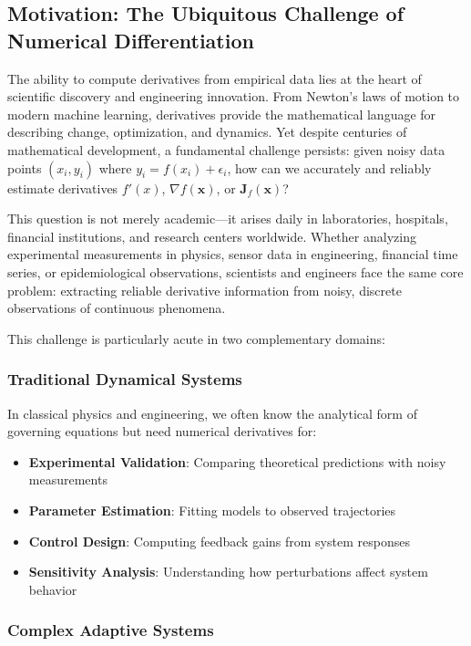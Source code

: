 \documentclass[10pt,journal,compsoc]{IEEEtran}
\begin{document}
\subsection{Motivation: The Ubiquitous Challenge of Numerical Differentiation}

The ability to compute derivatives from empirical data lies at the heart of scientific discovery and engineering innovation. From Newton's laws of motion to modern machine learning, derivatives provide the mathematical language for describing change, optimization, and dynamics. Yet despite centuries of mathematical development, a fundamental challenge persists: given noisy data points $(x_i, y_i)$ where $y_i = f(x_i) + \epsilon_i$, how can we accurately and reliably estimate derivatives $f'(x)$, $\nabla f(\mathbf{x})$, or $\mathbf{J}_f(\mathbf{x})$?

This question is not merely academic---it arises daily in laboratories, hospitals, financial institutions, and research centers worldwide. Whether analyzing experimental measurements in physics, sensor data in engineering, financial time series, or epidemiological observations, scientists and engineers face the same core problem: extracting reliable derivative information from noisy, discrete observations of continuous phenomena.

This challenge is particularly acute in two complementary domains:

\subsubsection{Traditional Dynamical Systems}

In classical physics and engineering, we often know the analytical form of governing equations but need numerical derivatives for:
\begin{itemize}
    \item \textbf{Experimental Validation}: Comparing theoretical predictions with noisy measurements
    \item \textbf{Parameter Estimation}: Fitting models to observed trajectories
    \item \textbf{Control Design}: Computing feedback gains from system responses
    \item \textbf{Sensitivity Analysis}: Understanding how perturbations affect system behavior
\end{itemize}

\subsubsection{Complex Adaptive Systems}
\end{document}

